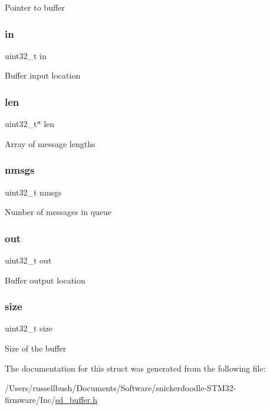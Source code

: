 Pointer to buffer \mbox{\label{structsd__msg__queue_a86fd6c417fa43c58339f7cde29495419}} 
\subsubsection{\texorpdfstring{in}{in}}
{\footnotesize\ttfamily uint32\+\_\+t in}

Buffer input location \mbox{\label{structsd__msg__queue_a4311b7376ae8adcd508957d7f7e94a5e}} 
\subsubsection{\texorpdfstring{len}{len}}
{\footnotesize\ttfamily uint32\+\_\+t$\ast$ len}

Array of message lengths \mbox{\label{structsd__msg__queue_acbd45720315c5c8ac04d64e460d2ab5a}} 
\subsubsection{\texorpdfstring{nmsgs}{nmsgs}}
{\footnotesize\ttfamily uint32\+\_\+t nmsgs}

Number of messages in queue \mbox{\label{structsd__msg__queue_ab27775f0ed2b042b439a7431fbe311eb}} 
\subsubsection{\texorpdfstring{out}{out}}
{\footnotesize\ttfamily uint32\+\_\+t out}

Buffer output location \mbox{\label{structsd__msg__queue_ab2c6b258f02add8fdf4cfc7c371dd772}} 
\subsubsection{\texorpdfstring{size}{size}}
{\footnotesize\ttfamily uint32\+\_\+t size}

Size of the buffer 

The documentation for this struct was generated from the following file\+:\begin{DoxyCompactItemize}
\item 
/\+Users/russellbush/\+Documents/\+Software/snickerdoodle-\/\+S\+T\+M32-\/firmware/\+Inc/\mbox{\hyperlink{sd__buffer_8h}{sd\+\_\+buffer.\+h}}\end{DoxyCompactItemize}
